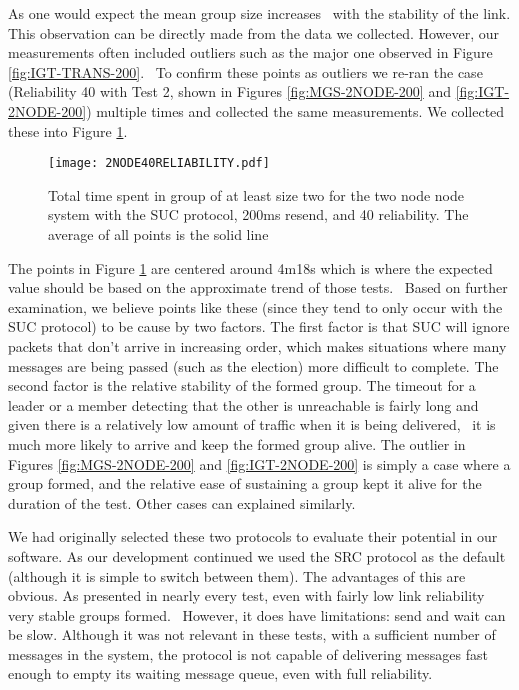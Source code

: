 As one would expect the mean group size increases  with the stability of the link. This observation can be directly made from the data we collected. However, our measurements often included outliers such as the major one observed in Figure \ref{fig:IGT-TRANS-200}.  To confirm these points as outliers we re-ran the case (Reliability 40 with Test 2, shown in Figures \ref{fig:MGS-2NODE-200} and \ref{fig:IGT-2NODE-200}) multiple times and collected the same measurements. We collected these into Figure \ref{fig:rerun}.

\begin{figure}[!h]
\centering
\texttt{[image: 2NODE40RELIABILITY.pdf]}
\caption{Total time spent in group of at least size two for the two node node system with the SUC protocol, 200ms resend, and 40 reliability. The average of all points is the solid line}
\label{fig:rerun}
\end{figure}

The points in Figure \ref{fig:rerun} are centered around 4m18s which is where the expected value should be based on the approximate trend of those tests.  Based on further examination, we believe points like these (since they tend to only occur with the SUC protocol) to be cause by two factors. The first factor is that SUC will ignore packets that don't arrive in increasing order, which makes situations where many messages are being passed (such as the election) more difficult to complete. The second factor is the relative stability of the formed group. The timeout for a leader or a member detecting that the other is unreachable is fairly long and given there is a relatively low amount of traffic when it is being delivered,  it is much more likely to arrive and keep the formed group alive. The outlier in Figures \ref{fig:MGS-2NODE-200} and \ref{fig:IGT-2NODE-200} is simply a case where a group formed, and the relative ease of sustaining a group kept it alive for the duration of the test. Other cases can explained similarly.

We had originally selected these two protocols to evaluate their potential in our software. As our development continued we used the SRC protocol as the default (although it is simple to switch between them). The advantages of this are obvious. As presented in nearly every test, even with fairly low link reliability very stable groups formed.  However, it does have limitations: send and wait can be slow. Although it was not relevant in these tests, with a sufficient number of messages in the system, the protocol is not capable of delivering messages fast enough to empty its waiting message queue, even with full reliability.

